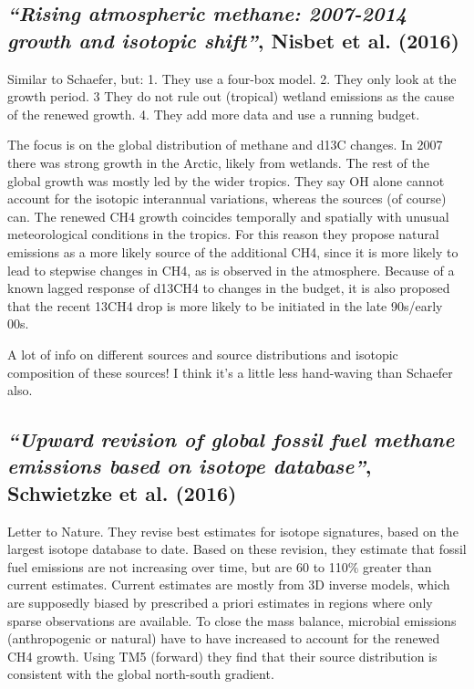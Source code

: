 \documentclass{article}
\begin{document}
\subsection{\textit{“Rising atmospheric methane: 2007-2014 growth and isotopic shift”}, Nisbet et al. (2016)}
Similar to Schaefer, but: 1. They use a four-box model. 2. They only look at the growth period. 3 They do not rule out (tropical) wetland emissions as the cause of the renewed growth. 4. They add more data and use a running budget.

The focus is on the global distribution of methane and d13C changes. In 2007 there was strong growth in the Arctic, likely from wetlands. The rest of the global growth was mostly led by the wider tropics. They say OH alone cannot account for the isotopic interannual variations, whereas the sources (of course) can. 
The renewed CH4 growth coincides temporally and spatially with unusual meteorological conditions in the tropics. For this reason they propose natural emissions as a more likely source of the additional CH4, since it is more likely to lead to stepwise changes in CH4, as is observed in the atmosphere.
Because of a known lagged response of d13CH4 to changes in the budget, it is also proposed that the recent 13CH4 drop is more likely to be initiated in the late 90s/early 00s.

A lot of info on different sources and source distributions and isotopic composition of these sources! I think it’s a little less hand-waving than Schaefer also.

\subsection{\textit{“Upward revision of global fossil fuel methane emissions based on isotope database”}, Schwietzke et al. (2016)}
Letter to Nature. They revise best estimates for isotope signatures, based on the largest isotope database to date. Based on these revision, they estimate that fossil fuel emissions are not increasing over time, but are 60 to 110$\%$ greater than current estimates. Current estimates are mostly from 3D inverse models, which are supposedly biased by prescribed a priori estimates in regions where only sparse observations are available. To close the mass balance, microbial emissions (anthropogenic or natural) have to have increased to account for the renewed CH4 growth. Using TM5 (forward) they find that their source distribution is consistent with the global north-south gradient.
\end{document}
